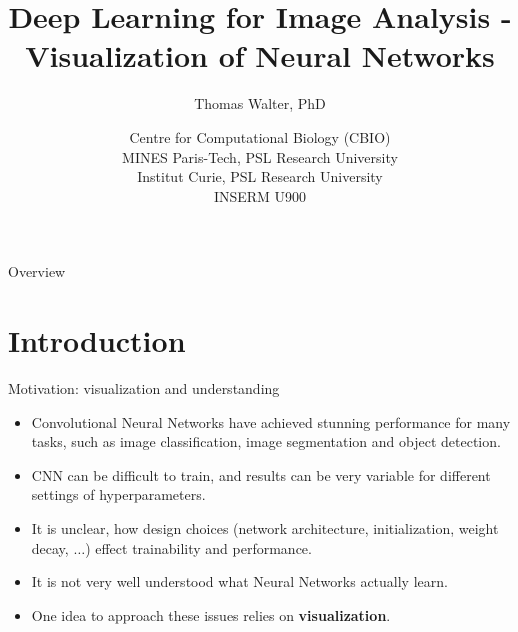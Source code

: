 \documentclass[xcolor=pdftex,dvipsnames,table]{beamer}
\title{Deep Learning for Image Analysis - \\ 
	   Visualization of Neural Networks}
\author{Thomas Walter, PhD}
\date{Centre for Computational Biology (CBIO) \\
	  MINES Paris-Tech, PSL Research University \\
	  Institut Curie, PSL Research University \\
	  INSERM U900}
\begin{document}
\begin{frame}
\titlepage
\end{frame}

\begin{frame}{Overview}
\tableofcontents
\end{frame}

\section{Introduction}

\begin{frame}{Motivation: visualization and understanding}
	\begin{itemize}
		\item Convolutional Neural Networks have achieved stunning performance for many tasks, such as image classification, image segmentation and object detection. 
		\item CNN can be difficult to train, and results can be very variable for different settings of hyperparameters. 
		\item It is unclear, how design choices (network architecture, initialization, weight decay, $\ldots$) effect trainability and performance. 
		\item It is not very well understood what Neural Networks actually learn. 
		\item One idea to approach these issues relies on {\bf visualization}.
	\end{itemize}
\end{frame}

\end{document}
